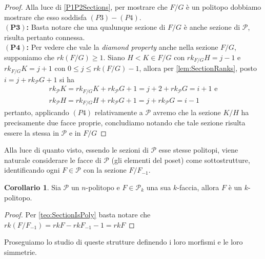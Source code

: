 \documentclass[a4paper,12pt]{report}
\newcommand{\p}{\mathcal{P}}
\theoremstyle{plain}
\theoremstyle{definition}
\newtheorem{corol}[teo]{Corollario}
\begin{document}
\begin{proof}
Alla luce di \ref{P1P2Sections}, per mostrare che $F/G$ \`e un politopo dobbiamo mostrare che esso soddisfa $(P3)-(P4)$.\\
$\bm{(P3)}$\textbf{:} Basta notare che una qualunque sezione di $F/G$ \`e anche sezione di $\p$, risulta pertanto connessa.\\
$\bm{(P4)}$\textbf{:} Per vedere che vale la \emph{diamond property} anche nella sezione $F/G$, supponiamo che $rk(F/G)\geq1$.
Siano $H<K\in F/G$ con $rk_{F/G}H=j-1$ e $rk_{F/G}K=j+1$ con $0\leq j\leq rk(F/G)-1$, allora per \ref{lem:SectionRanks}, posto
$i=j+rk_\p G+1$ si ha
\begin{gather*}
rk_\p K=rk_{F/G}K+rk_\p G+1=j+2+rk_\p G=i+1\text{ e}\\
rk_\p H=rk_{F/G}H+rk_\p G+1=j+rk_\p G=i-1
\end{gather*}
pertanto, applicando $(P4)$ relativamente a $\p$ avremo che la sezione $K/H$ ha precisamente due facce proprie, concludiamo notando che tale
sezione risulta essere la stessa in $\p$ e in $F/G$
\end{proof}
Alla luce di quanto visto, essendo le sezioni di $\p$ esse stesse politopi, viene naturale considerare le facce di $\p$ (gli elementi del poset)
come sottostrutture, identificando ogni $F\in\p$ con la sezione $F/F_{-1}$.
\begin{corol}
Sia $\p$ un $n$-politopo e $F\in\p_k$ una sua $k$-faccia, allora $F$ \`e un $k$-politopo.
\end{corol}
\begin{proof}
Per \ref{teo:SectionIsPoly} basta notare che $rk(F/F_{-1})=rkF-rkF_{-1}-1=rkF$
\end{proof}

Proseguiamo lo studio di queste strutture definendo i loro morfismi e le loro simmetrie.
\end{document}
